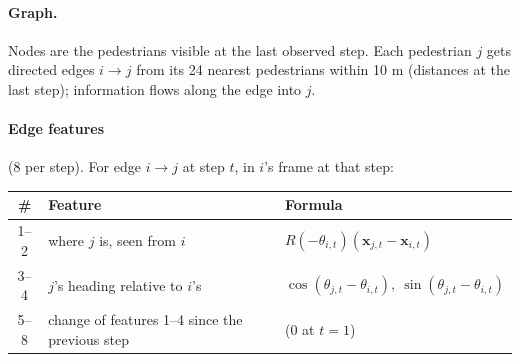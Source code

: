 \documentclass[10pt]{article}
\begin{document}

\paragraph{Graph.} Nodes are the pedestrians visible at the last observed step. Each pedestrian $j$ gets
directed edges $i\to j$ from its 24 nearest pedestrians within 10 m (distances at the last step); information
flows along the edge into $j$.


\paragraph{Edge features} (8 per step). For edge $i\to j$ at step $t$, in $i$'s frame at that step:

\begin{center}\small
\begin{tabular}{@{}cll@{}}
\toprule
\# & Feature & Formula \\
\midrule
1--2 & where $j$ is, seen from $i$ & $R(-\theta_{i,t})(\mathbf x_{j,t}-\mathbf x_{i,t})$ \\
3--4 & $j$'s heading relative to $i$'s & $\cos(\theta_{j,t}-\theta_{i,t}),\ \sin(\theta_{j,t}-\theta_{i,t})$ \\
5--8 & change of features 1--4 since the previous step & (0 at $t=1$) \\
\bottomrule
\end{tabular}
\end{center}


\end{document}
